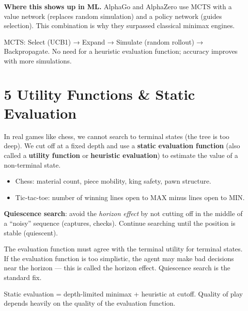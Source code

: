 \documentclass[a4paper,11pt]{article}
\begin{document}
\textbf{Where this shows up in ML.} AlphaGo and AlphaZero use MCTS with a value network (replaces random simulation) and a policy network (guides selection). This combination is why they surpassed classical minimax engines.

\begin{keytake}
MCTS: Select (UCB1) → Expand → Simulate (random rollout) → Backpropagate. No need for a heuristic evaluation function; accuracy improves with more simulations.
\end{keytake}

\section{5 \quad Utility Functions \& Static Evaluation}

In real games like chess, we cannot search to terminal states (the tree is too deep). We cut off at a fixed depth and use a \textbf{static evaluation function} (also called a \textbf{utility function} or \textbf{heuristic evaluation}) to estimate the value of a non-terminal state.

\begin{itemize}
  \item Chess: material count, piece mobility, king safety, pawn structure.
  \item Tic-tac-toe: number of winning lines open to MAX minus lines open to MIN.
\end{itemize}

\textbf{Quiescence search}: avoid the \emph{horizon effect} by not cutting off in the middle of a ``noisy'' sequence (captures, checks). Continue searching until the position is stable (quiescent).

\begin{watchout}
The evaluation function must agree with the terminal utility for terminal states. If the evaluation function is too simplistic, the agent may make bad decisions near the horizon — this is called the horizon effect. Quiescence search is the standard fix.
\end{watchout}

\begin{keytake}
Static evaluation = depth-limited minimax + heuristic at cutoff. Quality of play depends heavily on the quality of the evaluation function.
\end{keytake}
\end{document}

